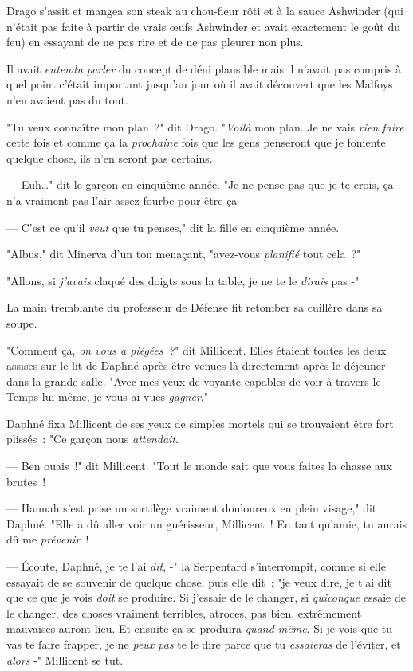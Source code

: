 \later

Drago s'assit et mangea son steak au chou-fleur rôti et à la sauce Ashwinder (qui n'était pas faite à partir de vrais œufs Ashwinder et avait exactement le goût du feu) en essayant de ne pas rire et de ne pas pleurer non plus.

Il avait \emph{entendu parler} du concept de déni plausible mais il n'avait pas compris à quel point c'était important jusqu'au jour où il avait découvert que les Malfoys n'en avaient pas du tout.

"Tu veux connaître mon plan~?" dit Drago. "\emph{Voilà} mon plan. Je ne vais \emph{rien faire} cette fois et comme ça la \emph{prochaine} fois que les gens penseront que je fomente quelque chose, ils n'en seront pas certains.

--- Euh…" dit le garçon en cinquième année. "Je ne pense pas que je te crois, ça n'a vraiment pas l'air assez fourbe pour être ça -

--- C'est ce qu'il \emph{veut} que tu penses," dit la fille en cinquième année.

\later

"Albus," dit Minerva d'un ton menaçant, "avez-vous \emph{planifié} tout cela~?"

\later

"Allons, si \emph{j'avais} claqué des doigts sous la table, je ne te le \emph{dirais} pas -"

\later

La main tremblante du professeur de Défense fit retomber sa cuillère dans sa soupe.

\later

"Comment ça, \emph{on vous a piégées~?}" dit Millicent. Elles étaient toutes les deux assises sur le lit de Daphné après être venues là directement après le déjeuner dans la grande salle. "Avec mes yeux de voyante capables de voir à travers le Temps lui-même, je vous ai vues \emph{gagner}."

Daphné fixa Millicent de ses yeux de simples mortels qui se trouvaient être fort plissés~: "Ce garçon nous \emph{attendait}.

--- Ben ouais~!" dit Millicent. "Tout le monde sait que vous faites la chasse aux brutes~!

--- Hannah s'est prise un sortilège vraiment douloureux en plein visage," dit Daphné. "Elle a dû aller voir un guérisseur, Millicent~! En tant qu'amie, tu aurais dû me \emph{prévenir}~!

--- Écoute, Daphné, je te l'ai \emph{dit}, -" la Serpentard s'interrompit, comme si elle essayait de se souvenir de quelque chose, puis elle dit~: "je veux dire, je t'ai dit que ce que je vois \emph{doit} se produire. Si j'essaie de le changer, si \emph{quiconque} essaie de le changer, des choses vraiment terribles, atroces, pas bien, extrêmement mauvaises auront lieu. Et ensuite ça se produira \emph{quand même}. Si je vois que tu vas te faire frapper, je ne \emph{peux pas} te le dire parce que tu \emph{essaieras} de l'éviter, et \emph{alors} -" Millicent se tut.

